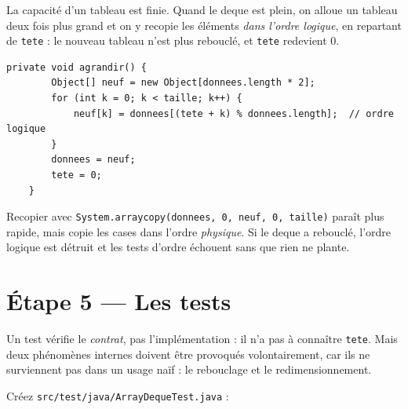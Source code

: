 \documentclass[11pt,a4paper]{article}
\begin{document}
\begin{lienbox}[Ce qu'on matérialise du CM]
La capacité d'un tableau est finie. Quand le deque est plein, on alloue un
tableau deux fois plus grand et on y recopie les éléments \emph{dans
l'ordre logique}, en repartant de \texttt{tete} : le nouveau tableau n'est
plus rebouclé, et \texttt{tete} redevient $0$.
\end{lienbox}

\begin{lstlisting}[caption={Agrandir en remettant l'anneau à plat}]
    private void agrandir() {
        Object[] neuf = new Object[donnees.length * 2];
        for (int k = 0; k < taille; k++) {
            neuf[k] = donnees[(tete + k) % donnees.length];  // ordre logique
        }
        donnees = neuf;
        tete = 0;
    }
\end{lstlisting}

\begin{attentionbox}
Recopier avec \texttt{System.arraycopy(donnees, 0, neuf, 0, taille)} paraît
plus rapide, mais copie les cases dans l'ordre \emph{physique}. Si le deque
a rebouclé, l'ordre logique est détruit et les tests d'ordre échouent sans
que rien ne plante.
\end{attentionbox}

\section{Étape 5 --- Les tests}

\begin{lienbox}[Ce qu'on matérialise du CM]
Un test vérifie le \emph{contrat}, pas l'implémentation : il n'a pas à
connaître \texttt{tete}. Mais deux phénomènes internes doivent être
provoqués volontairement, car ils ne surviennent pas dans un usage naïf : le
rebouclage et le redimensionnement.
\end{lienbox}

Créez \texttt{src/test/java/ArrayDequeTest.java} :
\end{document}

